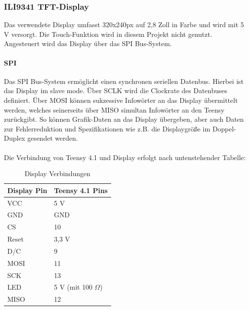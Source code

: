 \documentclass[12pt]{article}
\begin{document}
\subsubsection{ILI9341 TFT-Display}
Das verwendete Display umfasst 320x240px auf 2,8 Zoll in Farbe und wird mit 5 V versorgt.
Die Touch-Funktion wird in diesem Projekt nicht genutzt.
Angesteuert wird das Display über das SPI Bus-System.

\paragraph{SPI}
Das SPI Bus-System ermöglicht einen synchronen seriellen Datenbus. Hierbei ist das Display im \glq slave mode\grq{}\:.
Über SCLK wird die Clockrate des Datenbuses definiert. Über \glq MOSI\grq{}\: können sukzessive Infowörter an das Display übermittelt werden, welches 
seinerseits über \glq MISO\grq{}\: simultan Infowörter an den Teensy zurückgibt. So können Grafik-Daten an das Display übergeben, aber auch Daten zur 
Fehlerreduktion und Spezifikationen wie z.B. die Displaygröße im Doppel-Duplex gesendet werden.
\\
\\
Die Verbindung von Teensy 4.1 und Display erfolgt nach untenstehender Tabelle:
\\
\begin{table}[h]
  \centering
  \caption{Display Verbindungen}
  \label{tbl:displayverbindungen}
  \begin{tabular}{l|l}
    \textbf{Display Pin}  & \textbf{Teensy 4.1 Pins}\\
    \hline
    VCC & 5 V\\
 
    GND	 & GND\\
 
    CS	 & 10\\

    Reset	 & 3,3 V\\

    D/C	 & 9\\

    MOSI	 & 11\\

    SCK	 & 13\\

    LED	 & 5 V (mit 100 $\Omega$)\\

    MISO	 & 12\\
   

  \end{tabular}    

\end{table}
\end{document}
